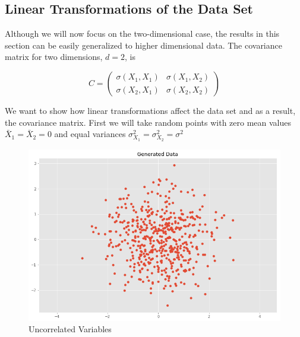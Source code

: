 \subsection{Linear Transformations of the Data Set}
Although we will now focus on the two-dimensional case, the results in this section can be easily generalized to higher dimensional data. The covariance matrix for two dimensions, $d=2$, is


$$C = \left( \begin{array}{ccc}  \sigma(X_1, X_1) & \sigma(X_1, X_2) \\  \sigma(X_2, X_1) & \sigma(X_2, X_2) \end{array} \right)$$

We want to show how linear transformations affect the data set and as a result, the covariance matrix. First we will take random points with zero mean values  $\bar{X}_1 = \bar{X}_2=0$ and equal variances $\sigma^2_{X_1}=\sigma^2_{X_2}=\sigma^2$  

\begin{figure}[h!]
  \centering
    \includegraphics[scale=0.3]{uncorrelated.png}
   \caption{Uncorrelated Variables}
\end{figure}


